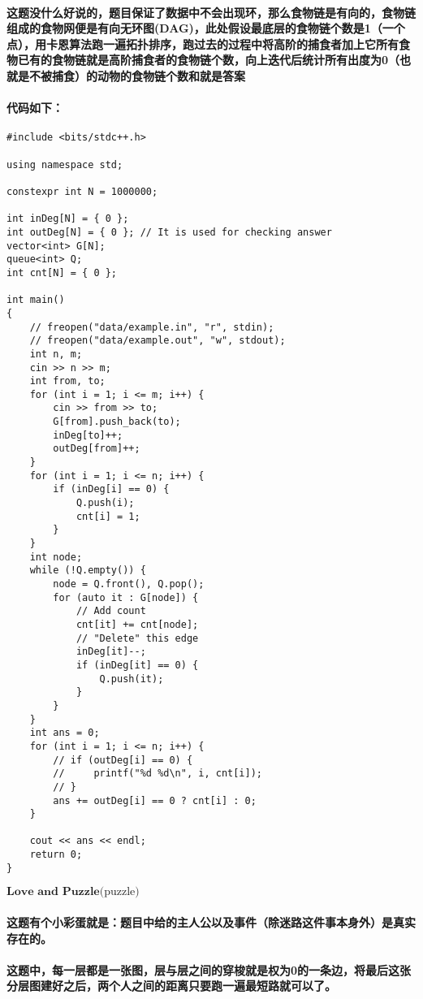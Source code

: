 \documentclass[final,11pt,oneside,UTF8]{report}
\begin{document}
\paragraph{这题没什么好说的，题目保证了数据中不会出现环，那么食物链是有向的，食物链组成的食物网便是有向无环图(DAG)，此处假设最底层的食物链个数是1（一个点），用卡恩算法跑一遍拓扑排序，跑过去的过程中将高阶的捕食者加上它所有食物已有的食物链就是高阶捕食者的食物链个数，向上迭代后统计所有出度为0（也就是不被捕食）的动物的食物链个数和就是答案}
\paragraph{代码如下：}
{
    \mono\begin{lstlisting}
#include <bits/stdc++.h>

using namespace std;

constexpr int N = 1000000;

int inDeg[N] = { 0 };
int outDeg[N] = { 0 }; // It is used for checking answer
vector<int> G[N];
queue<int> Q;
int cnt[N] = { 0 };

int main()
{
    // freopen("data/example.in", "r", stdin);
    // freopen("data/example.out", "w", stdout);
    int n, m;
    cin >> n >> m;
    int from, to;
    for (int i = 1; i <= m; i++) {
        cin >> from >> to;
        G[from].push_back(to);
        inDeg[to]++;
        outDeg[from]++;
    }
    for (int i = 1; i <= n; i++) {
        if (inDeg[i] == 0) {
            Q.push(i);
            cnt[i] = 1;
        }
    }
    int node;
    while (!Q.empty()) {
        node = Q.front(), Q.pop();
        for (auto it : G[node]) {
            // Add count
            cnt[it] += cnt[node];
            // "Delete" this edge
            inDeg[it]--;
            if (inDeg[it] == 0) {
                Q.push(it);
            }
        }
    }
    int ans = 0;
    for (int i = 1; i <= n; i++) {
        // if (outDeg[i] == 0) {
        //     printf("%d %d\n", i, cnt[i]);
        // }
        ans += outDeg[i] == 0 ? cnt[i] : 0;
    }

    cout << ans << endl;
    return 0;
}
    \end{lstlisting}
}
\newpage
\centerline{\LARGE{$\textbf{Love and Puzzle}\text{(puzzle)}$}}
\paragraph{这题有个小彩蛋就是：题目中给的主人公以及事件（除迷路这件事本身外）是真实存在的。}
\paragraph{这题中，每一层都是一张图，层与层之间的穿梭就是权为0的一条边，将最后这张分层图建好之后，两个人之间的距离只要跑一遍最短路就可以了。}
\end{document}
